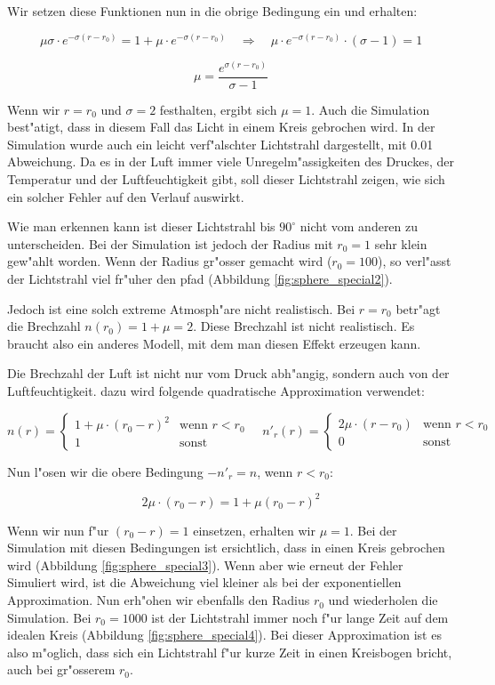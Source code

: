 \begin{refsection}
Wir setzen diese Funktionen nun in die obrige Bedingung ein und erhalten:

$$\mu \sigma \cdot e^{-\sigma (r-r_0)} = 1 + \mu \cdot e^{-\sigma (r-r_0)} \quad \Rightarrow \quad \mu \cdot e^{-\sigma (r-r_0)} \cdot (\sigma - 1) = 1$$

$$\mu = \frac{e^{\sigma (r-r_0)}}{\sigma - 1}$$

Wenn wir $r = r_0$ und $\sigma = 2$ festhalten, ergibt sich $\mu = 1$. 
Auch die Simulation best"atigt, dass in diesem Fall das Licht in einem Kreis gebrochen wird.
In der Simulation wurde auch ein leicht verf"alschter Lichtstrahl dargestellt, mit 0.01 Abweichung. 
Da es in der Luft immer viele Unregelm"assigkeiten des Druckes, der Temperatur und der Luftfeuchtigkeit gibt, soll dieser Lichtstrahl zeigen, wie sich ein solcher Fehler auf den Verlauf auswirkt.

Wie man erkennen kann ist dieser Lichtstrahl bis $90^\circ$ nicht vom anderen zu unterscheiden.
Bei der Simulation ist jedoch der Radius mit $r_0=1$ sehr klein gew"ahlt worden. 
Wenn der Radius gr"osser gemacht wird ($r_0 = 100$), so  verl"asst der Lichtstrahl viel fr"uher den pfad (Abbildung \ref{fig:sphere_special2}). 

Jedoch ist eine solch extreme Atmosph"are nicht realistisch. 
Bei $r = r_0$ betr"agt die Brechzahl $n(r_0) = 1 + \mu = 2$. 
Diese Brechzahl ist nicht realistisch. 
Es braucht also ein anderes Modell, mit dem man diesen Effekt erzeugen kann.

Die Brechzahl der Luft ist nicht nur vom Druck abh"angig, sondern auch von der Luftfeuchtigkeit. 
dazu wird folgende quadratische Approximation verwendet:

$$n(r) = \left\{ \begin{array}{ll} 1 + \mu \cdot (r_0 - r)^2 & \text{wenn } r < r_0 \\ 1 & \text{sonst} \end{array} \right. \quad n'_r(r) = \left\{ \begin{array}{ll} 2\mu \cdot (r - r_0) & \text{wenn } r < r_0 \\ 0 & \text{sonst} \end{array} \right.$$

Nun l"osen wir die obere Bedingung $-n'_r = n $, wenn $r < r_0$:

$$2\mu \cdot (r_0 - r) = 1 + \mu(r_0 - r)^2$$

Wenn wir nun f"ur $(r_0 - r) = 1$ einsetzen, erhalten wir $\mu = 1$. 
Bei der Simulation mit diesen Bedingungen ist ersichtlich, dass in einen Kreis gebrochen wird (Abbildung \ref{fig:sphere_special3}). 
Wenn aber wie erneut der Fehler Simuliert wird, ist die Abweichung viel kleiner als bei der exponentiellen Approximation. 
Nun erh"ohen wir ebenfalls den Radius $r_0$ und wiederholen die Simulation. 
Bei $r_0 = 1000$ ist der Lichtstrahl immer noch f"ur lange Zeit auf dem idealen Kreis (Abbildung \ref{fig:sphere_special4}). 
Bei dieser Approximation ist es also m"oglich, dass sich ein Lichtstrahl f"ur kurze Zeit in einen Kreisbogen bricht, auch bei gr"osserem $r_0$.


\end{refsection}
